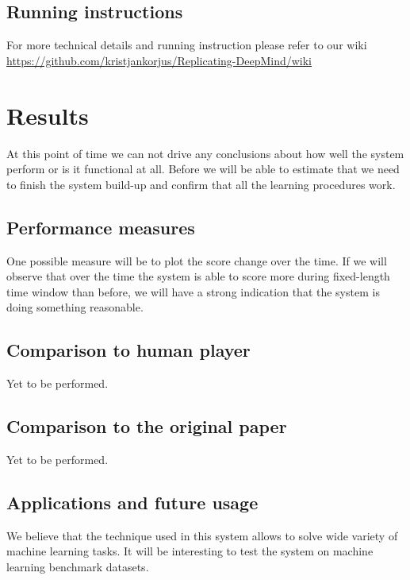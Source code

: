 \documentclass[a4paper,12pt]{article}
\begin{document}
\subsection{Running instructions}
For more technical details and running instruction please refer to our wiki \url{https://github.com/kristjankorjus/Replicating-DeepMind/wiki}


%
%
\pagebreak
\section{Results}
At this point of time we can not drive any conclusions about how well the system perform or is it functional at all. Before we will be able to estimate that we need to finish the system build-up and confirm that all the learning procedures work.

\subsection{Performance measures}
One possible measure will be to plot the score change over the time. If we will observe that over the time the system is able to score more during fixed-length time window than before, we will have a strong indication that the system is doing something reasonable.

\subsection{Comparison to human player}
Yet to be performed.

\subsection{Comparison to the original paper}
Yet to be performed.

\subsection{Applications and future usage}
We believe that the technique used in this system allows to solve wide variety of machine learning tasks. It will be interesting to test the system on machine learning benchmark datasets.



%
%
\pagebreak
{}


\end{document}

